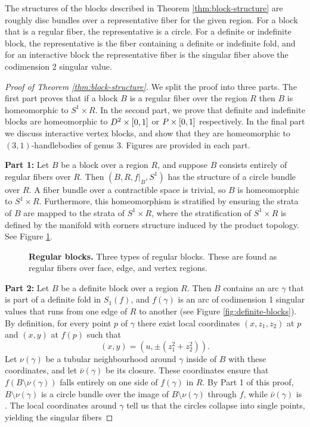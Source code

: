 \begin{rmk}
	The structures of the blocks described in Theorem \ref{thm:block-structure} are roughly disc bundles over a representative fiber for the given region.
	For a block that is a regular fiber, the representative is a circle.
	For a definite or indefinite block, the representative is the fiber containing a definite or indefinite fold, and for an interactive block the representative fiber is the singular fiber above the codimension 2 singular value.
\end{rmk}

\begin{proof}[Proof of Theorem \ref{thm:block-structure}]
	We split the proof into three parts.
	The first part proves that if a block $B$ is a regular fiber over the region $R$ then $B$ is homeomorphic to $S^1\times R$.
	In the second part, we prove that definite and indefinite blocks are homeomorphic to $D^2\times[0,1]$ or $P\times[0,1]$ respectively.
	In the final part we discuss interactive vertex blocks, and show that they are homeomorphic to $(3,1)$-handlebodies of genus 3.
	Figures are provided in each part.
	
	\textbf{Part 1:}
	Let $B$ be a block over a region $R$, and suppose $B$ consists entirely of regular fibers over $R$.
	Then $(B, R, f|_B, S^1)$ has the structure of a circle bundle over $R$.
	A fiber bundle over a contractible space is trivial, so $B$ is homeomorphic to $S^1 \times R$.
	Furthermore, this homeomorphism is stratified by ensuring the strata of $B$ are mapped to the strata of $S^1 \times R$, where the stratification of $S^1 \times R$ is defined by the manifold with corners structure induced by the product topology.
	See Figure \ref{fig:regular-blocks}.
	
	\begin{figure}[h!]
		\caption{
			\textbf{Regular blocks.}
			Three types of regular blocks.
			These are found as regular fibers over face, edge, and vertex regions.
		}
		\label{fig:regular-blocks}
	\end{figure}
	
	\textbf{Part 2:}
	Let $B$ be a definite block over a region $R$.
	Then $B$ contains an arc $\gamma$ that is part of a definite fold in $S_1(f)$, and $f(\gamma)$ is an arc of codimension 1 singular values that runs from one edge of $R$ to another (see Figure \ref{fig:definite-blocks}).
	By definition, for every point $p$ of $\gamma$ there exist local coordinates $(x,z_1,z_2)$ at $p$ and $(x,y)$ at $f(p)$ such that 
	\[(x,y) = (u,\pm(z_1^2+z_2^2)).\]
	Let $\nu(\gamma)$ be a tubular neighbourhood around $\gamma$ inside of $B$ with these coordinates, and let $\bar\nu(\gamma)$ be its closure.
	These coordinates ensure that $f(B\setminus\nu(\gamma))$ falls entirely on one side of $f(\gamma)$ in $R$.
	By Part 1 of this proof, $B\setminus\nu(\gamma)$ is a circle bundle over the image of $B\setminus\nu(\gamma)$ through $f$, while $\bar\nu(\gamma)$ is .
	The local coordinates around $\gamma$ tell us that the circles collapse into single points, yielding the singular fibers
	

\end{proof}
